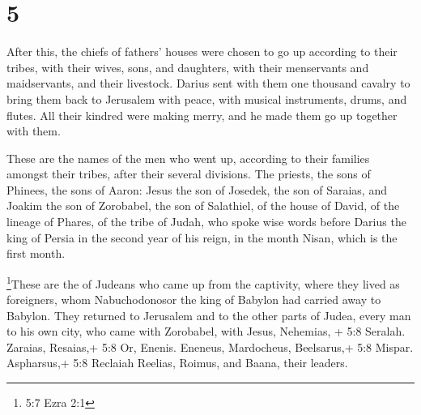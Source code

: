 \hypertarget{section-4}{%
\section{5}\label{section-4}}

 After this, the chiefs of fathers' houses were chosen to go
up according to their tribes, with their wives, sons, and daughters,
with their menservants and maidservants, and their livestock.
 Darius sent with them one thousand cavalry to bring them
back to Jerusalem with peace, with musical instruments, drums, and
flutes.  All their kindred were making merry, and he made
them go up together with them.

 These are the names of the men who went up, according to
their families amongst their tribes, after their several divisions.
 The priests, the sons of Phinees, the sons of Aaron: Jesus
the son of Josedek, the son of Saraias, and Joakim the son of Zorobabel,
the son of Salathiel, of the house of David, of the lineage of Phares,
of the tribe of Judah,  who spoke wise words before Darius
the king of Persia in the second year of his reign, in the month Nisan,
which is the first month.

 \footnote{5:7 Ezra 2:1}These are the of Judeans who came up
from the captivity, where they lived as foreigners, whom Nabuchodonosor
the king of Babylon had carried away to Babylon.  They
returned to Jerusalem and to the other parts of Judea, every man to his
own city, who came with Zorobabel, with Jesus, Nehemias, + 5:8 Seralah.
Zaraias, Resaias,+ 5:8 Or, Enenis. Eneneus, Mardocheus, Beelsarus,+ 5:8
Mispar. Aspharsus,+ 5:8 Reclaiah Reelias, Roimus, and Baana, their
leaders.


